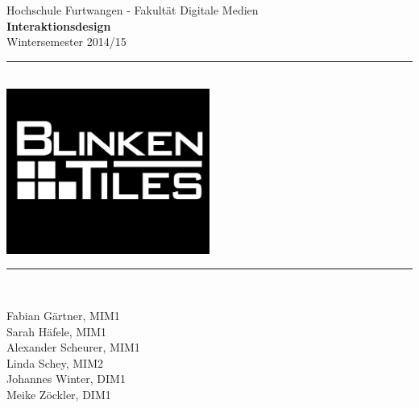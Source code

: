 \begin{titlepage}

\newcommand{\HRule}{\rule{\linewidth}{0.5mm}} %

\center %
 

\Large Hochschule Furtwangen - Fakultät Digitale Medien\\[0.5cm] %
{\Large \bfseries Interaktionsdesign}\\[0.5cm] %
\large Wintersemester 2014/15\\[0.5cm] %


\HRule \\[0.2cm]
\includegraphics[width=0.5\textwidth]{images/logo_final}\\[-0.35cm]
\HRule \\[0.7cm]
 

\begin{minipage}{0.55\textwidth}
\begin{flushleft} \large
Fabian Gärtner, MIM1\\
Sarah Häfele, MIM1\\
Alexander Scheurer, MIM1\\
Linda Schey, MIM2\\
Johannes Winter, DIM1\\
Meike Zöckler, DIM1\\


\end{flushleft}
\end{minipage}
\end{titlepage}
